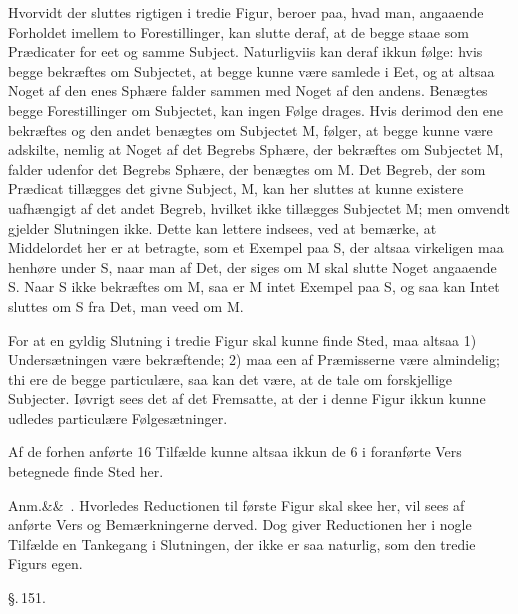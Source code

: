 \documentclass[12pt]{book}
\def\sperr#1{#1}%
\def\textit#1{#1}%
\newcommand{\sperr}[1]{\textls[180]{#1}}
\newcommand{\parag}[1]{%
  \par\vspace{0.9\baselineskip}%
  {\centering\textit{\S.\,#1.}\par}%
  \vspace{0.35\baselineskip}%
  \noindent\hspace{\parindent}\ignorespaces
}
\newcommand{\anm}[1]{%
  \par\vspace{0.5\baselineskip}%
  \noindent\hspace{\parindent}\sperr{Anm.}\ifx&#1&\else~\textit{#1}.\fi
  \enspace\ignorespaces
}
\newcommand{\opage}[1]{\marginnote{\footnotesize\textit{[#1]}}}
\begin{document}
Hvorvidt der sluttes rigtigen i tredie Figur, beroer paa, hvad man, angaaende
Forholdet imellem to Forestillinger, kan slutte deraf, at de begge staae som
Prædicater for eet og samme Subject. Naturligviis kan deraf ikkun følge: hvis
begge bekræftes om Subjectet, at begge kunne være samlede i Eet, og at altsaa
Noget af den enes Sphære falder sammen med Noget af den andens. Benægtes begge
Forestillinger om Subjectet, kan ingen Følge drages. Hvis derimod den ene
bekræftes og den andet benægtes om Subjectet \textit{M}, følger, at begge
kunne være adskilte, nemlig at Noget af det Begrebs
\opage{343} Sphære, der bekræftes om Subjectet \textit{M}, falder udenfor det Begrebs
Sphære, der benægtes om \textit{M}. Det Begreb, der som Prædicat tillægges det
givne Subject, \textit{M}, kan her sluttes at kunne existere uafhængigt af det
andet Begreb, hvilket ikke tillægges Subjectet \textit{M}; men omvendt gjelder
Slutningen ikke. Dette kan lettere indsees, ved at bemærke, at Middelordet her
er at betragte, som et Exempel paa \textit{S}, der altsaa virkeligen maa
henhøre under \textit{S}, naar man af Det, der siges om \textit{M} skal slutte
Noget angaaende \textit{S}. Naar \textit{S} ikke bekræftes om \textit{M}, saa
er \textit{M} intet Exempel paa \textit{S}, og saa kan Intet sluttes om
\textit{S} fra Det, man veed om \textit{M}.

For at en gyldig Slutning i tredie Figur skal kunne finde Sted, maa altsaa 1)
Undersætningen være bekræftende; 2) maa een af Præmisserne være almindelig;
thi ere de begge particulære, saa kan det være, at de tale om forskjellige
Subjecter. Iøvrigt sees det af det Fremsatte, at der i denne Figur ikkun kunne
udledes particulære Følgesætninger.

Af de forhen anførte 16 Tilfælde kunne altsaa ikkun de 6 i foranførte Vers
betegnede finde Sted her.

\anm{} Hvorledes Reductionen til første Figur skal skee her, vil sees af
anførte Vers og Bemærkningerne derved. Dog giver Reductionen her i nogle
Tilfælde en Tankegang i Slutningen, der ikke er saa naturlig, som den tredie
Figurs egen.
\opage{344} \parag{151}
\end{document}
